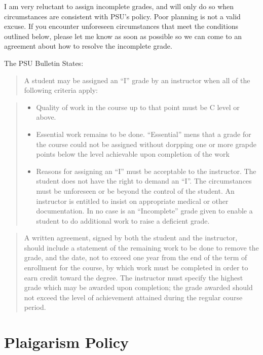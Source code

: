 \documentclass[11pt,]{article}
\providecommand{\tightlist}{%
  \setlength{\itemsep}{0pt}\setlength{\parskip}{0pt}}
\begin{document}
I am very reluctant to assign incomplete grades, and will only do so
when circumstances are consistent with PSU's policy. Poor planning is
not a valid excuse. If you encounter unforeseen circumstances that meet
the conditions outlined below, please let me know as soon as possible so
we can come to an agreement about how to resolve the incomplete grade.

The PSU Bulletin States:

\begin{quote}
A student may be assigned an ``I'' grade by an instructor when all of
the following criteria apply:
\end{quote}

\begin{quote}
\begin{itemize}
\tightlist
\item
  Quality of work in the course up to that point must be C level or
  above.
\item
  Essential work remains to be done. ``Essential'' mens that a grade for
  the course could not be assigned without dorpping one or more grapde
  points below the level achievable upon completion of the work
\item
  Reasons for assigning an ``I'' must be acceptable to the instructor.
  The student does not have the right to demand an ``I''. The
  circumstances must be unforeseen or be beyond the control of the
  student. An instructor is entitled to insist on appropriate medical or
  other documentation. In no case is an ``Incomplete'' grade given to
  enable a student to do additional work to raise a deficient grade.
\end{itemize}
\end{quote}

\begin{quote}
A written agreement, signed by both the student and the instructor,
should include a statement of the remaining work to be done to remove
the grade, and the date, not to exceed one year from the end of the term
of enrollment for the course, by which work must be completed in order
to earn credit toward the degree. The instructor must specify the
highest grade which may be awarded upon completion; the grade awarded
should not exceed the level of achievement attained during the regular
course period.
\end{quote}

\section{Plaigarism Policy}\label{plaigarism-policy}
\end{document}
